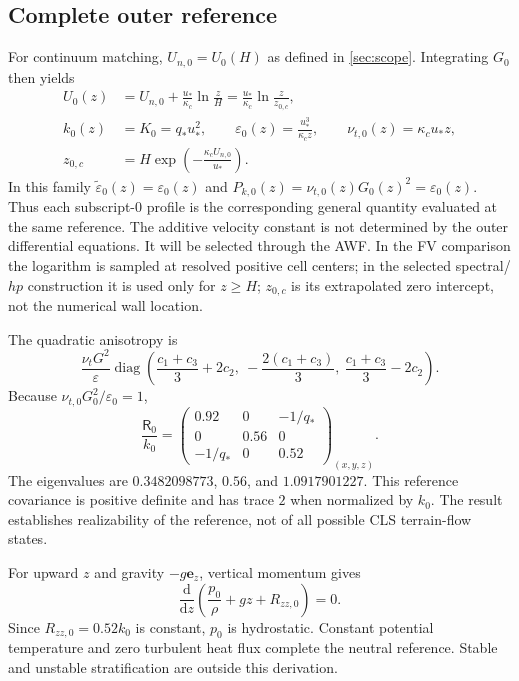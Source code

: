 \documentclass[11pt,a4paper]{article}
\numberwithin{equation}{section}
\newcommand{\dd}{\mathrm{d}}
\newcommand{\eps}{\varepsilon}
\newcommand{\et}{\widetilde{\varepsilon}}
\newcommand{\nut}{\nu_t}
\newcommand{\ust}{u_*}
\newcommand{\kc}{\kappa_c}
\newcommand{\qs}{q_*}
\newcommand{\diag}{\operatorname{diag}}
\newcommand{\R}{\mathsf{R}}
\begin{document}
\subsection{Complete outer reference}
For continuum matching, $U_{n,0}=U_0(H)$ as defined in
\cref{sec:scope}. Integrating $G_0$ then yields
\begin{equation}
\boxed{
\begin{aligned}
U_0(z)&=U_{n,0}+\frac{\ust}{\kc}\ln\frac{z}{H}
       =\frac{\ust}{\kc}\ln\frac{z}{z_{0,c}},\\
k_0(z)&=K_0=\qs\ust^2,\qquad
\eps_0(z)=\frac{\ust^3}{\kc z},\qquad
\nu_{t,0}(z)=\kc\ust z,\\
z_{0,c}&=H\exp\!\left(-\frac{\kc U_{n,0}}{\ust}\right).
\end{aligned}}
\label{eq:reference}
\end{equation}
In this family $\et_0(z)=\eps_0(z)$ and
$P_{k,0}(z)=\nu_{t,0}(z)G_0(z)^2=\eps_0(z)$. Thus each subscript-$0$
profile is the corresponding general quantity evaluated at the same
reference. The additive velocity constant is not determined by the outer
differential equations. It will be selected through the AWF. In the FV comparison the logarithm is sampled
at resolved positive cell centers; in the selected spectral/$hp$
construction it is used only for $z\geq H$; $z_{0,c}$ is its extrapolated zero
intercept, not the numerical wall location.

The quadratic anisotropy is
\begin{equation}
\frac{\nut G^2}{\eps}
\diag\!\left(
\frac{c_1+c_3}{3}+2c_2,\
-\frac{2(c_1+c_3)}3,\
\frac{c_1+c_3}{3}-2c_2
\right).
\end{equation}
Because $\nu_{t,0}G_0^2/\eps_0=1$,
\begin{equation}
\boxed{
\frac{\R_0}{k_0}
=\begin{pmatrix}
0.92&0&-1/\qs\\
0&0.56&0\\
-1/\qs&0&0.52
\end{pmatrix}_{(x,y,z)}.}
\label{eq:Rref}
\end{equation}
The eigenvalues are $0.3482098773$, $0.56$, and $1.0917901227$.
This reference covariance is positive definite and has trace $2$ when
normalized by $k_0$. The result establishes realizability of the
reference, not of all possible CLS terrain-flow states.

For upward $z$ and gravity $-g\bm e_z$, vertical momentum gives
\begin{equation}
 \frac{\dd}{\dd z}\left(\frac{p_0}{\rho}+gz+R_{zz,0}\right)=0.
 \label{eq:pressure}
\end{equation}
Since $R_{zz,0}=0.52k_0$ is constant, $p_0$ is hydrostatic. Constant
potential temperature and zero turbulent heat flux complete the neutral
reference. Stable and unstable stratification are outside this derivation.
\end{document}
